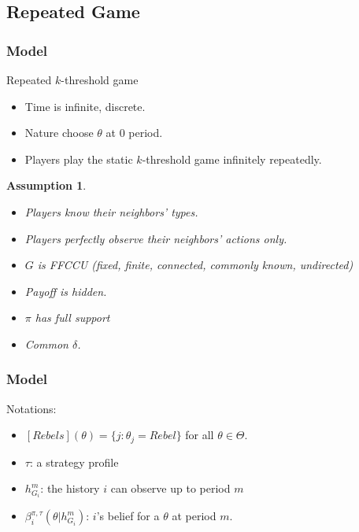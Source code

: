\documentclass[10pt]{beamer}
\newtheorem{assumption}{Assumption}[section]
\begin{document}
\subsection{Repeated Game}
\begin{frame}
  \frametitle{Model}
Repeated $k$-threshold game
  \begin{itemize}

  \item  Time is infinite, discrete.
  \item Nature choose $\theta$ at $0$ period.
  \item Players play the static $k$-threshold game infinitely repeatedly.


  \end{itemize}

\begin{assumption}
\begin{itemize}
\item Players know their neighbors' types.
\item Players perfectly observe their neighbors' actions only. 
\item $G$ is FFCCU (fixed, finite, connected, commonly known, undirected)
  \item Payoff is hidden.
  \item $\pi$ has full support

\item Common $\delta$. 
\end{itemize}

\end{assumption}

\end{frame}

\begin{frame}
  \frametitle{Model}

Notations:
\begin{itemize}
\item $[Rebels](\theta)=\{j:\theta_j=Rebel\}$ for all $\theta\in \Theta$.
 \item $\tau$: a strategy profile
 \item $h^{m}_{G_i}$: the history $i$ can observe up to period $m$
   \item $\beta^{\pi,\tau}_i(\theta|h^{m}_{G_i})$: $i$'s belief for a $\theta$ at period $m$. 
\end{itemize}

\end{frame}
\end{document}
